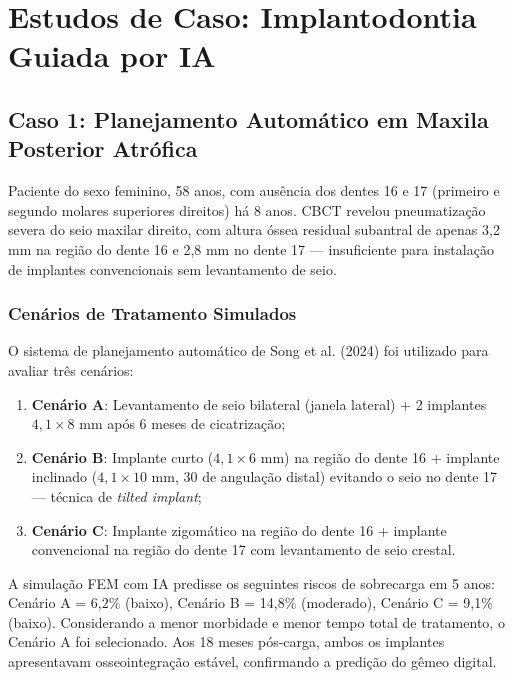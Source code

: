 
\section{Estudos de Caso: Implantodontia Guiada por IA}

\subsection{Caso 1: Planejamento Automático em Maxila Posterior Atrófica}

Paciente do sexo feminino, 58 anos, com ausência dos dentes 16 e 17 (primeiro e segundo molares superiores direitos) há 8 anos. CBCT revelou pneumatização severa do seio maxilar direito, com altura óssea residual subantral de apenas 3,2 mm na região do dente 16 e 2,8 mm no dente 17 --- insuficiente para instalação de implantes convencionais sem levantamento de seio.

\subsubsection{Cenários de Tratamento Simulados}

O sistema de planejamento automático de Song et al. (2024) foi utilizado para avaliar três cenários:
\begin{enumerate}
    \item \textbf{Cenário A}: Levantamento de seio bilateral (janela lateral) + 2 implantes $4,1 \times 8$ mm após 6 meses de cicatrização;
    \item \textbf{Cenário B}: Implante curto ($4,1 \times 6$ mm) na região do dente 16 + implante inclinado ($4,1 \times 10$ mm, 30\textdegree{} de angulação distal) evitando o seio no dente 17 --- técnica de \textit{tilted implant};
    \item \textbf{Cenário C}: Implante zigomático na região do dente 16 + implante convencional na região do dente 17 com levantamento de seio crestal.
\end{enumerate}

A simulação FEM com IA predisse os seguintes riscos de sobrecarga em 5 anos: Cenário A = 6,2\% (baixo), Cenário B = 14,8\% (moderado), Cenário C = 9,1\% (baixo). Considerando a menor morbidade e menor tempo total de tratamento, o Cenário A foi selecionado. Aos 18 meses pós-carga, ambos os implantes apresentavam osseointegração estável, confirmando a predição do gêmeo digital.

